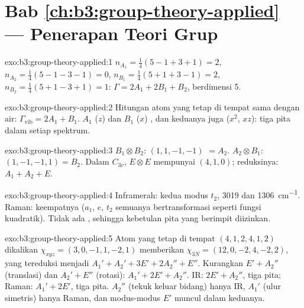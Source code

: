\section*{Bab \ref{ch:b3:group-theory-applied} --- Penerapan Teori Grup}

\begin{solution}{exo:b3:group-theory-applied:1}
$n_{A_1} = \frac14(5 - 1 + 3 + 1) = 2$, $n_{A_2} = \frac14(5 - 1 - 3 - 1) = 0$,
$n_{B_1} = \frac14(5 + 1 + 3 - 1) = 2$, $n_{B_2} = \frac14(5 + 1 - 3 + 1) = 1$:
$\Gamma = 2A_1 + 2B_1 + B_2$, berdimensi 5.
\end{solution}

\begin{solution}{exo:b3:group-theory-applied:2}
Hitungan atom yang tetap di tempat sama dengan air: $\Gamma_{\mathrm{vib}} = 2A_1 + B_1$.
$A_1$ ($z$) dan $B_1$ ($x$) , dan keduanya juga  ($x^2$,
$xz$): tiga pita dalam setiap spektrum.
\end{solution}

\begin{solution}{exo:b3:group-theory-applied:3}
$B_1\otimes B_2$:  $(1, 1, -1, -1)$ $= A_2$. $A_2\otimes B_1$: $(1, -1, -1,
1) = B_2$. Dalam $C_{3v}$, $E\otimes E$ mempunyai  $(4, 1, 0)$;
reduksinya: $A_1 + A_2 +
E$.
\end{solution}

\begin{solution}{exo:b3:group-theory-applied:4}
Inframerah: kedua modus $t_2$, 3019 dan \qty{1306}{cm^{-1}}. Raman: keempatnya
($a_1$, $e$, $t_2$ semuanya bertransformasi seperti fungsi kuadratik). Tidak
ada , sehingga kebetulan pita yang berimpit diizinkan.
\end{solution}

\begin{solution}{exo:b3:group-theory-applied:5}
Atom yang tetap di tempat $(4, 1, 2, 4, 1, 2)$ dikalikan
$\chi_{xyz} = (3, 0, -1, 1, -2, 1)$ memberikan
$\chi_{3N} = (12, 0, -2, 4, -2, 2)$, yang tereduksi menjadi $A_1' + A_2' + 3E' + 2A_2'' +
E''$. Kurangkan $E' + A_2''$ (translasi) dan $A_2' + E''$ (rotasi): $A_1' + 2E'
+ A_2''$. IR: $2E' + A_2''$, tiga pita; Raman: $A_1' + 2E'$, tiga pita. $A_2''$
(tekuk keluar bidang) hanya IR, $A_1'$ (ulur simetris) hanya Raman, dan
modus-modus $E'$ muncul dalam keduanya.
\end{solution}


